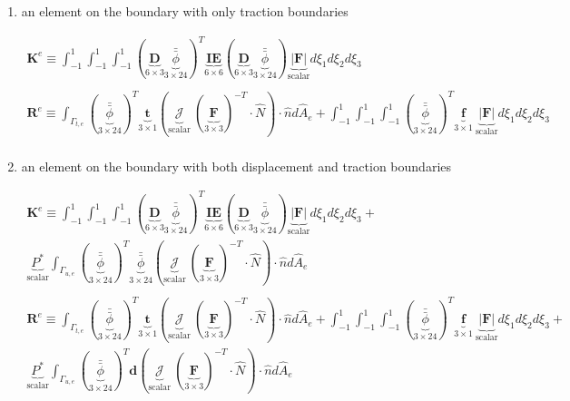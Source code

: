 \documentclass[10pt]{article}
\begin{document}
\begin{enumerate}
\item an element on the boundary with only traction boundaries

\begin{equation}
\begin{aligned}
\textbf{K}^e\equiv\int_{-1}^{1}\int_{-1}^{1}\int_{-1}^{1}(\underbrace{\textbf{D}}_{6\times3}\underbrace{\bar{\bar{\phi}}}_{3\times24})^T\underbrace{\textbf{IE}}_{6\times6}(\underbrace{\textbf{D}}_{6\times3}\underbrace{\bar{\bar{\phi}}}_{3\times24})\underbrace{|\textbf{F}|}_\text{scalar}d\xi_1d\xi_2d\xi_3\\
\ \\
\textbf{R}^e\equiv\int_{\Gamma_{t,e}}(\underbrace{\bar{\bar{\phi}}}_{3\times24})^T\underbrace{\textbf{t}}_{3\times1}(\underbrace{\mathscr{J}}_\text{scalar}\ (\underbrace{\textbf{F}}_{3\times3})^{-T}\cdot\hat{N})\cdot\hat{n}d\hat{A}_e+\int_{-1}^{1}\int_{-1}^{1}\int_{-1}^{1}(\underbrace{\bar{\bar{\phi}}}_{3\times24})^T\underbrace{\textbf{f}}_{3\times1}\ \underbrace{|\textbf{F}|}_\text{scalar}d\xi_1d\xi_2d\xi_3\\
\end{aligned}
\end{equation}

\item an element on the boundary with both displacement and traction boundaries

\begin{equation}
\begin{aligned}
\textbf{K}^e\equiv\int_{-1}^{1}\int_{-1}^{1}\int_{-1}^{1}(\underbrace{\textbf{D}}_{6\times3}\underbrace{\bar{\bar{\phi}}}_{3\times24})^T\underbrace{\textbf{IE}}_{6\times6}(\underbrace{\textbf{D}}_{6\times3}\underbrace{\bar{\bar{\phi}}}_{3\times24})\underbrace{|\textbf{F}|}_\text{scalar}d\xi_1d\xi_2d\xi_3 +\quad\\
\underbrace{P^{*}}_\text{scalar}\int_{\Gamma_{u,e}}(\underbrace{\bar{\bar{\phi}}}_{3\times24})^T\underbrace{\bar{\bar{\phi}}}_{3\times24}(\underbrace{\mathscr{J}}_\text{scalar}\ (\underbrace{\textbf{F}}_{3\times3})^{-T}\cdot\hat{N})\cdot\hat{n}d\hat{A}_e\\
\ \\
\textbf{R}^e\equiv\int_{\Gamma_{t,e}}(\underbrace{\bar{\bar{\phi}}}_{3\times24})^T\underbrace{\textbf{t}}_{3\times1}(\underbrace{\mathscr{J}}_\text{scalar}\ (\underbrace{\textbf{F}}_{3\times3})^{-T}\cdot\hat{N})\cdot\hat{n}d\hat{A}_e+\int_{-1}^{1}\int_{-1}^{1}\int_{-1}^{1}(\underbrace{\bar{\bar{\phi}}}_{3\times24})^T\underbrace{\textbf{f}}_{3\times1}\ \underbrace{|\textbf{F}|}_\text{scalar}d\xi_1d\xi_2d\xi_3+\quad\\
\underbrace{P^{*}}_\text{scalar}\int_{\Gamma_{u,e}}(\underbrace{\bar{\bar{\phi}}}_{3\times24})^T\textbf{d}(\underbrace{\mathscr{J}}_\text{scalar}\ (\underbrace{\textbf{F}}_{3\times3})^{-T}\cdot\hat{N})\cdot\hat{n}d\hat{A}_e\\
\end{aligned}
\end{equation}
\end{enumerate}
\end{document}
